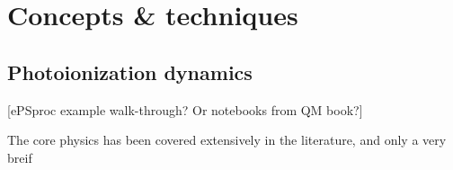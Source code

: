 \section{Concepts \& techniques}

\subsection{Photoionization dynamics} 
[ePSproc example walk-through? Or notebooks from QM book?]

The core physics has been covered extensively in the literature, and only a very breif